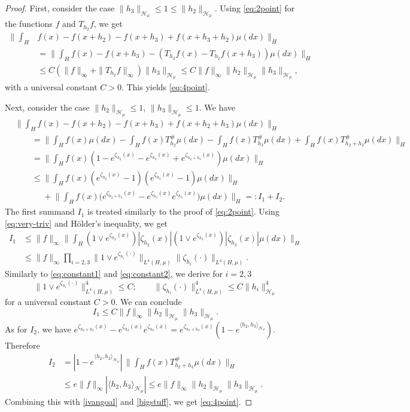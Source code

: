 \documentclass[10pt,a4paper]{amsart}
\newcommand{\CM}{\H_\mu}
\renewcommand{\H}{\mathcal{H}}
\renewcommand{\le}{\leqslant}
\newcommand{\nn}{\nonumber}
\begin{document}
\begin{proof}
First, consider the case $\|h_3\|_{\CM}\leqslant 1 \leqslant \|h_2\|_{\CM}$.
Using \eqref{eq:2point} for the functions $f$ and $T_{h_2}f$, we get
\begin{align*}
    \Big\|\int_H &f(x)-f(x+h_2)-f(x+h_3)+f(x+h_3+h_2) \mu(dx)\Big\|_{H} \\ &=\Big\|\int_H f(x)-f(x+h_3)-(T_{h_2}f(x)-T_{h_2}f(x+h_3)) \mu(dx) \Big\|_{H}\\
    &\leqslant C(\|f\|_\infty + \|T_{h_2}f\|_\infty)\|h_3\|_{\CM}\le C \|f\|_\infty \|h_2\|_{\CM}\|h_3\|_{\CM},
\end{align*}
with a universal constant $C>0$. This yields \eqref{eq:4point}.

Next, consider the case $\|h_2\|_{\CM}\le1$, $\|h_3\|_{\CM} \leqslant 1$. 
We have
\begin{align}\label{bigstuff}
&\Big\|\int_H f(x)-f(x+h_2)-f(x+h_3)+f(x+h_2+h_3) \mu(dx)\Big\|_{H}\nn\\
&\qquad=\Big\|\int_H f(x)\mu(dx) -\int_H f(x)T_{h_2}^\#\mu(dx) -\int_H f(x)T_{h_3}^\#\mu(dx) +\int_H f(x)T_{h_2+h_3}^\#\mu(dx) \Big\|_{H}\nn\\
&\qquad= \Big\|\int_H f(x)(1-e^{\zeta_{h_2}(x)}-e^{\zeta_{h_3}(x)}+e^{\zeta_{h_2+h_3}(x)})\mu(dx)\Big\|_{H}\nn\\
&\qquad\leqslant \Big\|\int_H f(x)(e^{\zeta_{h_2}(x)}-1)(e^{\zeta_{h_3}(x)}-1)\mu(dx)\Big\|_{H}\nn\\
&\qquad{\phantom{\le}} +\Big\|\int_H f(x)\Big(e^{\zeta_{h_2+h_3}(x)}-e^{\zeta_{h_2}(x)}e^{\zeta_{h_3}(x)}\Big) \mu(dx)\Big\|_{H}=:I_1+I_2.
\end{align}
The first summand $I_1$ is treated similarly to the proof of \eqref{eq:2point}. Using \eqref{eq:very-triv} and H\"older's inequality, we get 
\begin{align*}
I_1&\le \|f\|_\infty\Big\|\int_H  (1\vee e^{\zeta_{h_2}(x)}) |\zeta_{h_2}(x)|(1\vee e^{\zeta_{h_3}(x)}) |\zeta_{h_3}(x)| \mu(dx)\Big\|_{H}\\
&\le\|f\|_\infty \prod_{i=2,3} \|1\vee e^{\zeta_{h_i}(\cdot)}\|_{L^4(H,\mu)} \|\zeta_{h_i}(\cdot)\|_{L^4(H,\mu)}.
\end{align*}
Similarly to \eqref{eq:constant1} and \eqref{eq:constant2}, we derive for $i=2,3$
\begin{equation*}
\|1\vee e^{\zeta_{h_i}(\cdot)}\|_{L^4(H,\mu)}^4\le C;\qquad
\|\zeta_{h_i}(\cdot)\|_{L^4(H,\mu)}^4\le C \|h_i\|_{\CM}^4   
\end{equation*}
for a universal constant $C>0$. We can conclude
\begin{equation}\label{ivangoal}
    I_1\leqslant C\|f\|_\infty\|h_2\|_{\CM}\|h_3\|_{\CM}. 
\end{equation}
As for $I_2$, we have $e^{\zeta_{h_2+h_3}(x)}-e^{\zeta_{h_2}(x)}e^{\zeta_{h_3}(x)}=e^{\zeta_{h_2+h_3}(x)}(1-e^{\langle h_2,h_3\rangle_{\CM}})$. Therefore
\begin{align*}
I_2&=|1-e^{\langle h_2,h_3\rangle_{\CM}}|\,\Big\|\int_H f(x)T_{h_2+h_3}^\# \mu(dx)\Big\|_{H}\\
&\le  e\|f\|_\infty|\langle h_2,h_3\rangle_{\CM}|\leqslant e \|f\|_\infty \|h_2\|_{\CM} \|h_3\|_{\CM}.
\end{align*}
Combining this with \eqref{ivangoal} and \eqref{bigstuff}, we get 
\eqref{eq:4point}.
\end{proof}
\end{document}

